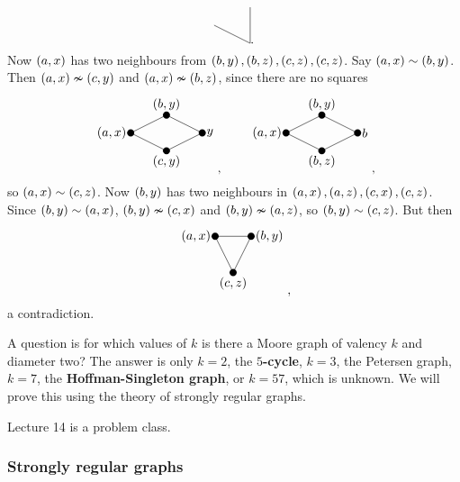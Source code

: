 \begin{example*}
\begin{itemize}
$$\begin{tikzpicture}
\draw (0, 0) to (1, -0.5);
\draw (1, 0.5) to (1, -0.5);
\end{tikzpicture}.
$$
Now $ \br{a, x} $ has two neighbours from $ \br{b, y}, \br{b, z}, \br{c, z}, \br{c, z} $. Say $ \br{a, x} \sim \br{b, y} $. Then $ \br{a, x} \nsim \br{c, y} $ and $ \br{a, x} \nsim \br{b, z} $, since there are no squares
$$
\begin{tikzpicture}
\fill (0, 0) circle (0.1) node[left]{$ \br{a, x} $};
\fill (1, 0.5) circle (0.1) node[above]{$ \br{b, y} $};
\fill (1, -0.5) circle (0.1) node[below]{$ \br{c, y} $};
\fill (2, 0) circle (0.1) node[right]{$ y $};
\draw (0, 0) to (1, 0.5);
\draw (0, 0) to (1, -0.5);
\draw (1, 0.5) to (2, 0);
\draw (1, -0.5) to (2, 0);
\end{tikzpicture},
\qquad
\begin{tikzpicture}
\fill (0, 0) circle (0.1) node[left]{$ \br{a, x} $};
\fill (1, 0.5) circle (0.1) node[above]{$ \br{b, y} $};
\fill (1, -0.5) circle (0.1) node[below]{$ \br{b, z} $};
\fill (2, 0) circle (0.1) node[right]{$ b $};
\draw (0, 0) to (1, 0.5);
\draw (0, 0) to (1, -0.5);
\draw (1, 0.5) to (2, 0);
\draw (1, -0.5) to (2, 0);
\end{tikzpicture},
$$
so $ \br{a, x} \sim \br{c, z} $. Now $ \br{b, y} $ has two neighbours in $ \br{a, x}, \br{a, z}, \br{c, x}, \br{c, z} $. Since $ \br{b, y} \sim \br{a, x} $, $ \br{b, y} \nsim \br{c, x} $ and $ \br{b, y} \nsim \br{a, z} $, so $ \br{b, y} \sim \br{c, z} $. But then
$$
\begin{tikzpicture}
\fill (0, 0) circle (0.1) node[left]{$ \br{a, x} $};
\fill (1, 0) circle (0.1) node[right]{$ \br{b, y} $};
\fill (0.5, -1) circle (0.1) node[below]{$ \br{c, z} $};
\draw (0, 0) to (1, 0);
\draw (0, 0) to (0.5, -1);
\draw (1, 0) to (0.5, -1);
\end{tikzpicture},
$$
a contradiction.
\end{itemize}
\end{example*}

A question is for which values of $ k $ is there a Moore graph of valency $ k $ and diameter two? The answer is only $ k = 2 $, the \textbf{$ 5 $-cycle}, $ k = 3 $, the Petersen graph, $ k = 7 $, the \textbf{Hoffman-Singleton graph}, or $ k = 57 $, which is unknown. We will prove this using the theory of strongly regular graphs.


Lecture 14 is a problem class.

\subsubsection{Strongly regular graphs}


